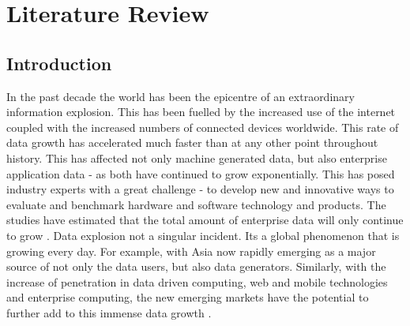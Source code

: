 
\chapter{Literature Review} %

\label{Chapter2} %



\section{Introduction}

In the past decade the world has been the epicentre of an extraordinary information explosion. This has been fuelled by the increased use of the internet coupled with the increased numbers of connected devices worldwide.  This rate of data growth has accelerated much faster than at any other point throughout history. This has affected not only machine generated data, but also enterprise application data - as both have continued to grow exponentially. This has posed industry experts with a great challenge - to develop new and innovative ways to evaluate and benchmark hardware and software technology and products. The studies have estimated that the total amount of enterprise data will only continue to grow \cite{gantz2012digital}. Data explosion not a singular incident. Its a global phenomenon that is growing every day. For example, with Asia now rapidly emerging as a major source of not only the data users, but also data generators. Similarly, with the increase of penetration in data driven computing, web and mobile technologies and enterprise computing, the new emerging markets have the potential to further add to this immense data growth \cite{kambatla2014trends}. 

